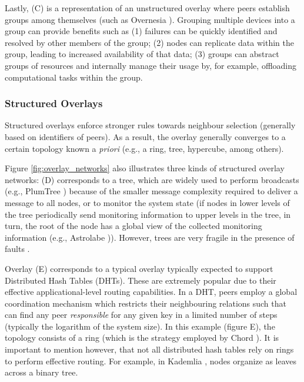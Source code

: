 Lastly, (C) is a representation of an unstructured overlay where peers establish groups among themselves (such as Overnesia \cite{leitao2014overnesia}). Grouping multiple devices into a group can provide benefits such as (1) failures can be quickly identified and resolved by other members of the group; (2) nodes can replicate data within the group, leading to increased availability of that data; (3) groups can abstract groups of resources and internally manage their usage by, for example, offloading computational tasks within the group. 

\subsubsection*{Structured Overlays}

Structured overlays enforce stronger rules towards neighbour selection (generally based on identifiers of peers). As a result, the overlay generally converges to a certain topology known a \textit{priori} (e.g., a ring, tree, hypercube, among others). 

Figure \ref{fig:overlay_networks} also illustrates three kinds of structured overlay networks: (D) corresponds to a tree, which are widely used to perform broadcasts (e.g., PlumTree \cite{plumTree}) because of the smaller message complexity required to deliver a message to all nodes, or to monitor the system state (if nodes in lower levels of the tree periodically send monitoring information to upper levels in the tree, in turn, the root of the node has a global view of the collected monitoring information (e.g., Astrolabe \cite{Renesse2003})). However, trees are very fragile in the presence of faults \cite{plumTree}.

Overlay (E) corresponds to a typical overlay typically expected to support Distributed Hash Tables (DHTs). These are extremely popular due to their effective applicational-level routing capabilities. In a DHT, peers employ a global coordination mechanism which restricts their neighbouring relations such that can find any peer \textit{responsible} for any given key in a  limited number of steps (typically the logarithm of the system size). In this example (figure E), the topology consists of a ring (which is the strategy employed by Chord \cite{stoica2003chord}). It is important to mention however, that not all distributed hash tables rely on rings to perform effective routing. For example, in Kademlia \cite{maymounkov2002kademlia}, nodes organize as leaves across a binary tree.

